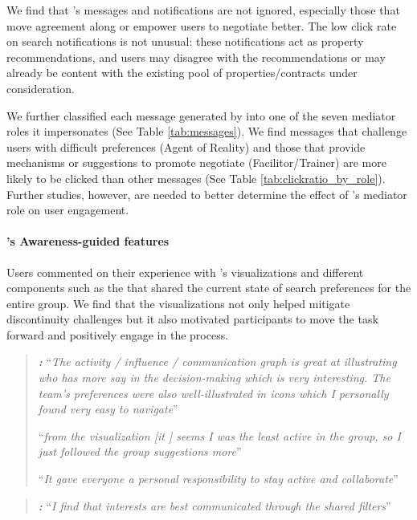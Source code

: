 We find that \cbot's messages and notifications are not ignored, especially those that move agreement along or empower users to negotiate better. The low click rate on search notifications is not unusual: these notifications act as property recommendations, and users may disagree with the recommendations or may already be content with the existing pool of properties/contracts under consideration. 

We further classified each message generated by \cbot into one of the seven mediator roles it impersonates (See Table \ref{tab:messages}). We find messages that challenge users with difficult preferences (Agent of Reality) and those that provide mechanisms or suggestions to promote negotiate (Facilitor/Trainer) are more likely to be clicked than other messages (See Table \ref{tab:clickratio_by_role}). Further studies, however, are needed to better determine the effect of \cbot's mediator role on user engagement.


\paragraph{\tool's Awareness-guided features}

Users commented on their experience with \tool's visualizations and different components such as the \collabQueryPanel that shared the current state of search preferences for the entire group. We find that the visualizations not only helped mitigate discontinuity challenges but it also motivated participants to move the task forward and positively engage in the process.
\begin{quote}
\textbf{\textit{\collaboRatio:}} ``\textit{The activity / influence / communication graph is great at illustrating who has more say in the decision-making which is very interesting. The team’s preferences were also well-illustrated in icons which I personally found very easy to navigate}'' 

``\textit{from the visualization [it ] seems I
was the least active in the group, so I just followed the group suggestions more}''

``\textit{It gave everyone a personal responsibility to stay active and collaborate}''
\end{quote}

\begin{quote}
\textbf{\textit{\collabQueryPanel:}} ``\textit{I find that interests are best communicated through the shared filters}'' 
\end{quote}


